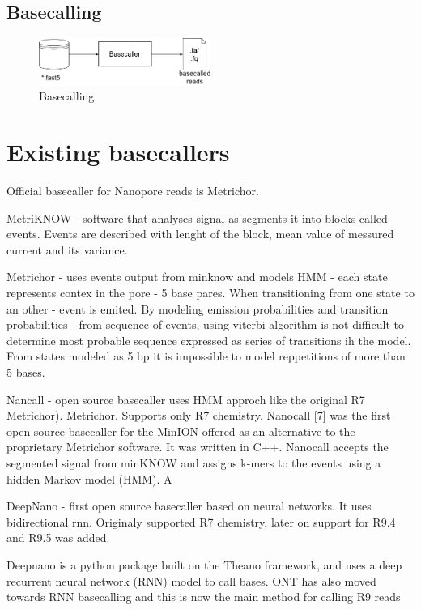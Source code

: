 \documentclass[times, utf8, diplomski, english]{fer}
\begin{document}
\subsection{Basecalling}

\begin{figure}[!ht]
	\begin{center}
		\includegraphics[width=0.5\textwidth]{./imgs/basecalling.png}
		\caption{Basecalling}
		\label{fg:basecalling}
	\end{center}
\end{figure}


\section{Existing basecallers}

Official basecaller for Nanopore reads is Metrichor. 

MetriKNOW - software that analyses signal as segments it into blocks called events. Events are described with lenght of the block, mean value of messured current and its variance.

Metrichor - uses events output from minknow and models HMM  - each state represents contex in the pore - 5 base pares. When transitioning from one state to an other - event is emited. By modeling emission probabilities and transition probabilities - from sequence of events, using viterbi algorithm is not difficult to determine most probable sequence expressed as series of transitions ih the model.
From states modeled as 5 bp it is impossible to model reppetitions of more than 5 bases.


Nancall - open source basecaller uses HMM approch like the original R7 Metrichor). Metrichor. Supports only R7 chemistry. 
Nanocall [7] was the first open-source basecaller for the MinION offered as an alternative to the proprietary Metrichor software. It was written in C++. Nanocall accepts the segmented signal from minKNOW and assigns
k-mers to the events using a hidden Markov model (HMM). A

DeepNano - first open source basecaller based on neural networks. It uses bidirectional rnn. Originaly supported R7 chemistry, later on support for R9.4 and R9.5 was added.

Deepnano is a python package built on the Theano framework, and uses a deep recurrent neural network (RNN) model to call bases. ONT has also moved towards RNN basecalling and this is now the main method for calling R9 reads
\end{document}
